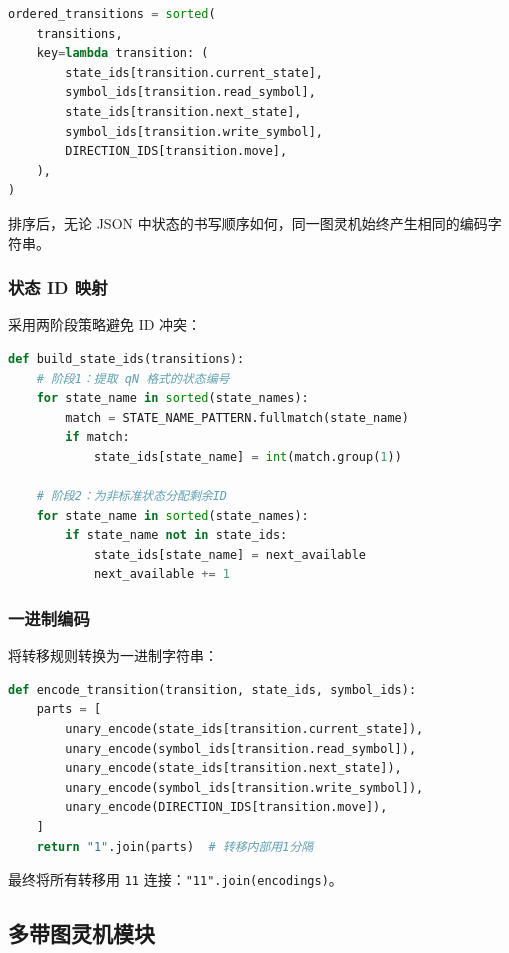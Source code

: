 \documentclass{sysucseexp}
\begin{document}
\begin{lstlisting}[language=Python]
ordered_transitions = sorted(
    transitions,
    key=lambda transition: (
        state_ids[transition.current_state],
        symbol_ids[transition.read_symbol],
        state_ids[transition.next_state],
        symbol_ids[transition.write_symbol],
        DIRECTION_IDS[transition.move],
    ),
)
\end{lstlisting}

排序后，无论 JSON 中状态的书写顺序如何，同一图灵机始终产生相同的编码字符串。

\subsubsection{状态 ID 映射}

采用两阶段策略避免 ID 冲突：

\begin{lstlisting}[language=Python]
def build_state_ids(transitions):
    # 阶段1：提取 qN 格式的状态编号
    for state_name in sorted(state_names):
        match = STATE_NAME_PATTERN.fullmatch(state_name)
        if match:
            state_ids[state_name] = int(match.group(1))
    
    # 阶段2：为非标准状态分配剩余ID
    for state_name in sorted(state_names):
        if state_name not in state_ids:
            state_ids[state_name] = next_available
            next_available += 1
\end{lstlisting}

\subsubsection{一进制编码}

将转移规则转换为一进制字符串：

\begin{lstlisting}[language=Python]
def encode_transition(transition, state_ids, symbol_ids):
    parts = [
        unary_encode(state_ids[transition.current_state]),
        unary_encode(symbol_ids[transition.read_symbol]),
        unary_encode(state_ids[transition.next_state]),
        unary_encode(symbol_ids[transition.write_symbol]),
        unary_encode(DIRECTION_IDS[transition.move]),
    ]
    return "1".join(parts)  # 转移内部用1分隔
\end{lstlisting}

最终将所有转移用 \texttt{11} 连接：\texttt{"11".join(encodings)}。

\subsection{多带图灵机模块}
\end{document}
